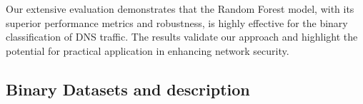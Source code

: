 Our extensive evaluation demonstrates that the Random Forest model, with its superior performance metrics and robustness, is highly effective for the binary classification of DNS traffic. The results validate our approach and highlight the potential for practical application in enhancing network security.





\subsection{Binary Datasets and description}

